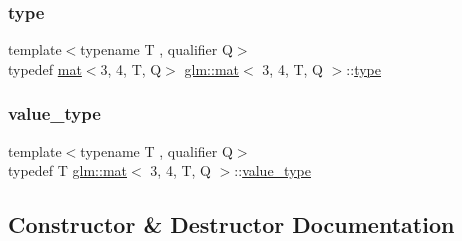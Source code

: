 \mbox{\label{structglm_1_1mat_3_013_00_014_00_01_t_00_01_q_01_4_a6742d5174ea43a0298a2bceb2636736a}} 
\subsubsection{\texorpdfstring{type}{type}}
{\footnotesize\ttfamily template$<$typename T , qualifier Q$>$ \\
typedef \hyperlink{structglm_1_1mat}{mat}$<$3, 4, T, Q$>$ \hyperlink{structglm_1_1mat}{glm\+::mat}$<$ 3, 4, T, Q $>$\+::\hyperlink{structglm_1_1mat_3_013_00_014_00_01_t_00_01_q_01_4_a6742d5174ea43a0298a2bceb2636736a}{type}}

\mbox{\label{structglm_1_1mat_3_013_00_014_00_01_t_00_01_q_01_4_a5fafacf57e2d28a8de693056c450088c}} 
\subsubsection{\texorpdfstring{value\+\_\+type}{value\_type}}
{\footnotesize\ttfamily template$<$typename T , qualifier Q$>$ \\
typedef T \hyperlink{structglm_1_1mat}{glm\+::mat}$<$ 3, 4, T, Q $>$\+::\hyperlink{structglm_1_1mat_3_013_00_014_00_01_t_00_01_q_01_4_a5fafacf57e2d28a8de693056c450088c}{value\+\_\+type}}



\subsection{Constructor \& Destructor Documentation}
\mbox{\label{structglm_1_1mat_3_013_00_014_00_01_t_00_01_q_01_4_ab9511e49e913947be5af4f97b0703de7}} 
